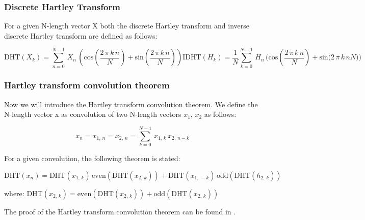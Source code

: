 \documentclass[12pt,twoside,a4paper]{article}
\numberwithin{equation}{subsection}
\numberwithin{figure}{subsection}
\begin{document}
\subsubsection*{Discrete Hartley Transform}

For a given N-length vector X both the discrete Hartley transform and inverse discrete Hartley transform are defined as follows:

\begin{subequations} \label{eq:fhta_definition}
  \begin{equation}   \label{eq:fhtadef_dht}
    \mathrm{DHT}({X_{k}})=\sum_{n=0}^{N - 1}\,{X_{n}}\,(\mathrm{cos}(\frac {2\,\pi \,k\,n}{N}) + \mathrm{sin}(\frac {2\,\pi
    \,k\,n}{N}))
  \end{equation}
  \begin{equation}   \label{eq:fhtadef_idht}
    \mathrm{IDHT}({H_{k}})=\frac {1}{N} {\sum_{k=0}^{N - 1}\,{H_{n}}\,(\mathrm{cos}(\frac {2\,\pi \,k\,n}{N}) + \mathrm{sin}(2\,\pi
     \,k\,n}{N})) 
  \end{equation}
\end{subequations}

\subsubsection*{Hartley transform convolution theorem}

Now we will introduce the Hartley transform convolution theorem. We define the N-length vector x as convolution of two N-length
vectors ${x_{1}}$, ${x_{2}}$ as follows:

\begin{equation} \label{eq:hartley_convolution}
  {x_{n}}={x_{1, \,n}} = {x_{2, \,n}} = \sum_{k=0}^{N - 1}\,{x_{1, \,k}}\,{x_{2, \,n - k}} 
\end{equation}

For a given convolution, the following theorem is stated:

\begin{equation} \label{eq:hartley_theorem}
  \mathrm{DHT}({x_{n}})=\mathrm{DHT}({x_{1, \,k}})\,\mathrm{even}(\mathrm{DHT}({x_{2, \,k}})) + \mathrm{DHT}({x_{1, \, -
  k}})\,\mathrm{odd}(\mathrm{DHT}({h_{2, \,k}}))
\end{equation}

where: $\mathrm{DHT}({x_{2, \,k}})=\mathrm{even}(\mathrm{DHT}({x_{2, \,k}})) + \mathrm{odd}(\mathrm{DHT}({x_{2, \,k}}))$%

The proof of the Hartley transform convolution theorem can be found in \cite{chang_computation}. 
\end{document}
